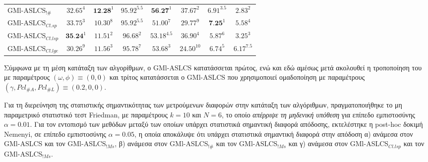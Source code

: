 \begin{table}[!h]
\begin{center}
\begin{tabular}{l|cccccc|c}
    GMl-ASLCS$_{!\#}$    & $32.65^4$    & $\textbf{12.28}^1$   & $95.92^{5.5}$ & $\textbf{56.27}^1$ & $37.67^2$    & $6.91^{3.5}$ & $2.83^2$        \\
    GMl-ASLCS$_{Cl.sp}$  & $33.75^3$    & $10.30^8$   & $95.92^{5.5}$ & $51.00^7$      & $29.77^9$    & $\textbf{7.25}^1$     & $5.58^4$         \\
    GMl-ASLCS$_{Cl.lsp}$ & $\textbf{35.24}^1$    & $11.51^2$   & $96.68^2$     & $53.18^{4.5}$ & $36.90^4$    & $5.87^6$     & $3.25^3$          \\
    GMl-ASLCS$_{Cl.lge}$ & $30.26^9$    & $11.56^3$   & $95.78^7$     & $53.68^3$ & $24.50^{10}$ & $6.74^5$     & $6.17^{7.5}$         \\ \hline
    \end{tabular}
    \end{center}
\end{table}


Σύμφωνα με τη μέση κατάταξη των αλγορίθμων, ο GMl-ASLCS κατατάσσεται πρώτος, ενώ και εδώ αμέσως μετά ακολουθεί η τροποποίηση του με παραμέτρους $(\omega, \phi) \equiv (0,0)$ και τρίτος κατατάσσεται ο GMl-ASLCS που χρησιμοποιεί ομαδοποίηση με παραμέτρους $(\gamma, Pcl_{\#A}, Pcl_{\#L}) \equiv (0.2, 0, 0)$.

Για τη διερεύνηση της στατιστικής σημαντικότητας των μετρούμενων διαφορών στην κατάταξη των αλγόριθμων, πραγματοποιήθηκε το μη παραμετρικό στατιστικό τεστ Friedman, με παραμέτρους $k=10$ και $N=6$, το οποίο \emph{απέρριψε τη μηδενική υπόθεση} για επίπεδο εμπιστοσύνης $\alpha = 0.01$. Για τον εντοπισμό των μεθόδων μεταξύ των οποίων υπάρχει στατιστικά σημαντική διαφορά απόδοσης, εκτελέστηκε η post-hoc δοκιμή Nemenyi, σε επίπεδο εμπιστοσύνης $\alpha=0.05$, η οποία αποκάλυψε ότι υπάρχει στατιστικά σημαντική διαφορά στην απόδοση α) ανάμεσα στον GMl-ASLCS και τον GMl-ASLCS$_{!Ms}$, β) ανάμεσα στον GMl-ASLCS$_{!\#}$ και τον GMl-ASLCS$_{!Ms}$ και γ) ανάμεσα στον GMl-ASLCS$_{Cl.lsp}$ και τον GMl-ASLCS$_{!Ms}$.


